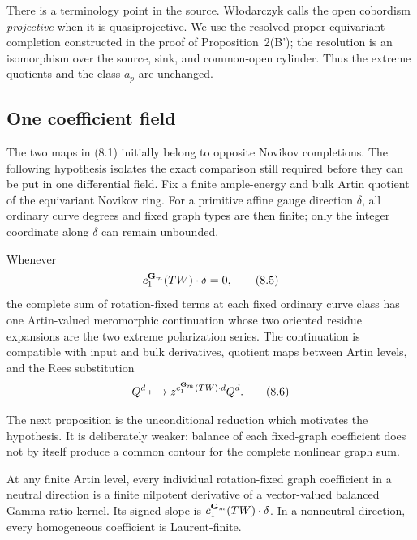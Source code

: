 There is a terminology point in the source.  W{\l}odarczyk calls the open
cobordism \emph{projective} when it is quasiprojective.  We use the resolved
proper equivariant completion constructed in the proof of
Proposition~2(B'); the resolution is an isomorphism over the source, sink,
and common-open cylinder.  Thus the extreme quotients and the class \(a_p\)
are unchanged.

\subsection{One coefficient field}

The two maps in (8.1) initially belong to opposite Novikov completions.  The
following hypothesis isolates the exact comparison still required before
they can be put in one differential field.  Fix a finite ample-energy and
bulk Artin quotient of the equivariant Novikov ring.  For a primitive affine
gauge direction \(\delta\), all ordinary curve degrees and fixed graph types
are then finite; only the integer coordinate along \(\delta\) can remain
unbounded.

\begin{hypothesis}
\label{hyp:complete-neutral}
Whenever
\[
 c_1^{\mathbf G_m}(TW)\cdot\delta=0,                                 \tag{8.5}
\]
the complete sum of rotation-fixed terms at each fixed ordinary curve class
has one Artin-valued meromorphic continuation whose two oriented residue
expansions are the two extreme polarization series.  The continuation is
compatible with input and bulk derivatives, quotient maps between Artin
levels, and the Rees substitution
\[
 Q^d\longmapsto z^{c_1^{\mathbf G_m}(TW)\cdot d}Q^d.                 \tag{8.6}
\]
\end{hypothesis}

The next proposition is the unconditional reduction which motivates the
hypothesis.  It is deliberately weaker: balance of each fixed-graph
coefficient does not by itself produce a common contour for the complete
nonlinear graph sum.

\begin{proposition}
\label{prop:gamma-ratio-reduction}
At any finite Artin level, every individual rotation-fixed graph coefficient
in a neutral direction is a finite nilpotent derivative of a vector-valued
balanced Gamma-ratio kernel.  Its signed slope is
\(c_1^{\mathbf G_m}(TW)\cdot\delta\).  In a nonneutral direction, every homogeneous
coefficient is Laurent-finite.
\end{proposition}

